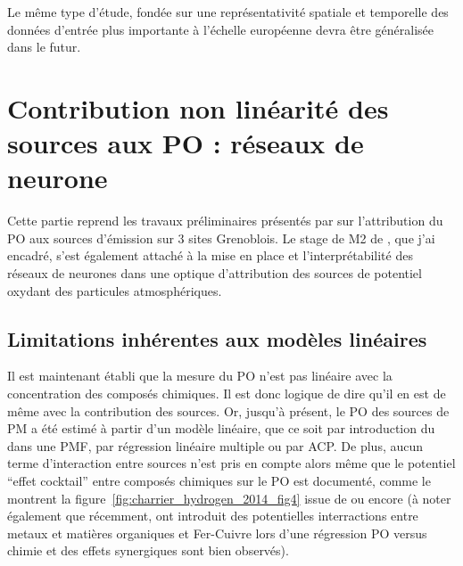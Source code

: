 Le même type d'étude, fondée sur une représentativité spatiale et temporelle des données
d'entrée plus importante à l'échelle européenne devra être généralisée dans le futur.


\section{Contribution non linéarité des sources aux PO : réseaux de neurone}%
\label{sec:reseau_neurone}

\begin{tcolorbox}[colback=red!5!white,colframe=Melon,title=Note]
    Cette partie reprend les travaux préliminaires présentés par \cite{borlazaUrbaninprep.} sur 
    l'attribution du PO aux sources d'émission sur 3 sites Grenoblois. Le stage de M2 de
    \cite{fichesMachine2020}, que j'ai encadré, s'est également attaché à la mise en place et
    l'interprétabilité des réseaux de neurones dans une optique d'attribution des sources
    de potentiel oxydant des particules atmosphériques.
\end{tcolorbox}

\subsection{Limitations inhérentes aux modèles linéaires}%
\label{sub:limitations_inhérentes_aux_modèles_linéaires}


Il est maintenant établi que la mesure du PO n'est pas linéaire avec la concentration des composés
chimiques. Il est donc logique de dire qu'il en est de même avec la contribution des
sources.
Or, jusqu'à présent, le PO des sources de PM a été estimé à partir d'un modèle linéaire,
que ce soit par introduction du \POv{} dans une PMF, par régression linéaire multiple ou
par ACP.
De plus, aucun terme d'interaction entre sources n'est pris en compte alors même que
le potentiel ``effet cocktail'' entre composés chimiques sur le PO est documenté, comme le
montrent la figure~\ref{fig:charrier_hydrogen_2014_fig4} issue de
\cite{charrierHydrogen2014} ou encore 
\cites[figure S7 du supplément]{charrierDithiothreitol2012}{xiongRethinking2017}{samakeUnexpected2017}{yuSynergistic2018}
(à noter également que récemment, \cite{gaoCharacterization2020} ont introduit des
potentielles interractions entre metaux et matières organiques et Fer-Cuivre lors d'une régression PO
versus chimie et des effets synergiques sont bien observés).

